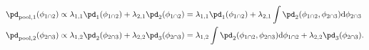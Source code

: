 \begin{align}
  \pd_{\text{pool}, 1}(\phi_{1 \cap 2}) &\propto \lambda_{1, 1}\pd_{1}(\phi_{1 \cap 2}) + \lambda_{2, 1}\pd_{2}(\phi_{1 \cap 2}) = \lambda_{1, 1}\pd_{1}(\phi_{1 \cap 2}) + \lambda_{2, 1}\int\pd_{2}(\phi_{1 \cap 2}, \phi_{2 \cap 3}) \text{d}\phi_{2 \cap 3} 
  \label{eqn:silly-linear-solution-1}
  \\
  \pd_{\text{pool}, 2}(\phi_{2 \cap 3}) &\propto \lambda_{1, 2}\pd_{2}(\phi_{2 \cap 3}) + \lambda_{2, 2}\pd_{3}(\phi_{2 \cap 3}) = \lambda_{1, 2}\int\pd_{2}(\phi_{1 \cap 2}, \phi_{2 \cap 3})\text{d}\phi_{1 \cap 2} + \lambda_{2, 2}\pd_{3}(\phi_{2 \cap 3}).
  \label{eqn:silly-linear-solution-2}
\end{align}